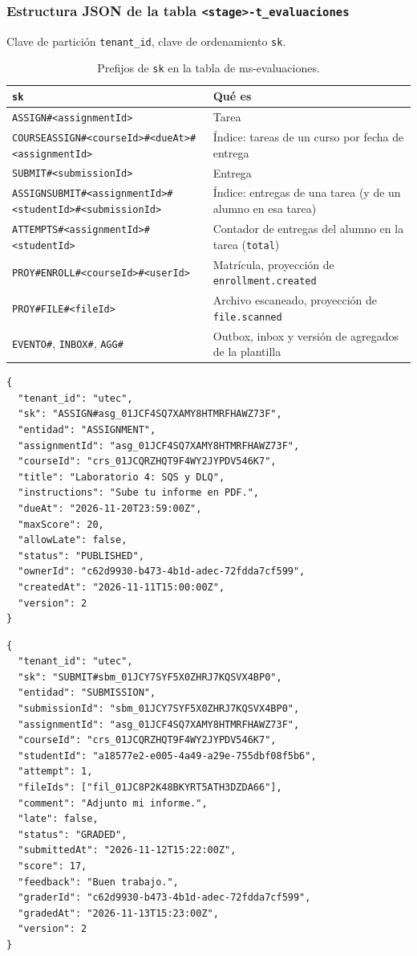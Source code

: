 \subsubsection{Estructura JSON de la tabla \texttt{<stage>-t\_evaluaciones}}
Clave de partición \texttt{tenant\_id}, clave de ordenamiento \texttt{sk}.

\begin{table}[htbp]
\centering\small
\begin{tabularx}{\textwidth}{>{\raggedright\arraybackslash}p{}X}
\toprule
\texttt{sk} & Qué es \\
\midrule
\texttt{ASSIGN\#<assignmentId>} & Tarea \\
\texttt{COURSEASSIGN\#<courseId>\#<dueAt>\#<assignmentId>} & Índice: tareas de un curso por fecha de entrega \\
\texttt{SUBMIT\#<submissionId>} & Entrega \\
\texttt{ASSIGNSUBMIT\#<assignmentId>\#<studentId>\#<submissionId>} & Índice: entregas de una tarea (y de un alumno en esa tarea) \\
\texttt{ATTEMPTS\#<assignmentId>\#<studentId>} & Contador de entregas del alumno en la tarea (\texttt{total}) \\
\texttt{PROY\#ENROLL\#<courseId>\#<userId>} & Matrícula, proyección de \texttt{enrollment.created} \\
\texttt{PROY\#FILE\#<fileId>} & Archivo escaneado, proyección de \texttt{file.scanned} \\
\texttt{EVENTO\#}, \texttt{INBOX\#}, \texttt{AGG\#} & Outbox, inbox y versión de agregados de la plantilla \\
\bottomrule
\end{tabularx}
\caption{Prefijos de \texttt{sk} en la tabla de ms-evaluaciones.}
\end{table}

\begin{lstlisting}
{
  "tenant_id": "utec",
  "sk": "ASSIGN#asg_01JCF4SQ7XAMY8HTMRFHAWZ73F",
  "entidad": "ASSIGNMENT",
  "assignmentId": "asg_01JCF4SQ7XAMY8HTMRFHAWZ73F",
  "courseId": "crs_01JCQRZHQT9F4WY2JYPDV546K7",
  "title": "Laboratorio 4: SQS y DLQ",
  "instructions": "Sube tu informe en PDF.",
  "dueAt": "2026-11-20T23:59:00Z",
  "maxScore": 20,
  "allowLate": false,
  "status": "PUBLISHED",
  "ownerId": "c62d9930-b473-4b1d-adec-72fdda7cf599",
  "createdAt": "2026-11-11T15:00:00Z",
  "version": 2
}
\end{lstlisting}

\begin{lstlisting}
{
  "tenant_id": "utec",
  "sk": "SUBMIT#sbm_01JCY7SYF5X0ZHRJ7KQSVX4BP0",
  "entidad": "SUBMISSION",
  "submissionId": "sbm_01JCY7SYF5X0ZHRJ7KQSVX4BP0",
  "assignmentId": "asg_01JCF4SQ7XAMY8HTMRFHAWZ73F",
  "courseId": "crs_01JCQRZHQT9F4WY2JYPDV546K7",
  "studentId": "a18577e2-e005-4a49-a29e-755dbf08f5b6",
  "attempt": 1,
  "fileIds": ["fil_01JC8P2K48BKYRT5ATH3DZDA66"],
  "comment": "Adjunto mi informe.",
  "late": false,
  "status": "GRADED",
  "submittedAt": "2026-11-12T15:22:00Z",
  "score": 17,
  "feedback": "Buen trabajo.",
  "graderId": "c62d9930-b473-4b1d-adec-72fdda7cf599",
  "gradedAt": "2026-11-13T15:23:00Z",
  "version": 2
}
\end{lstlisting}

